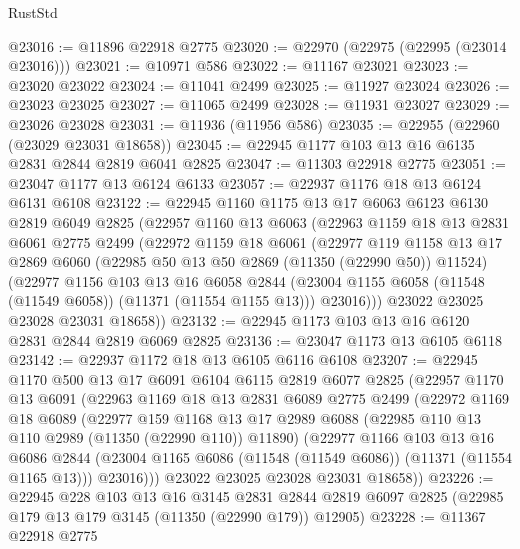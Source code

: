 \begin{lexlean}{RustStd}
\begin{coremodule}
@23016 := @11896 @22918 @2775
@23020 := @22970 (@22975 (@22995 (@23014 @23016)))
@23021 := @10971 @586
@23022 := @11167 @23021
@23023 := @23020 @23022
@23024 := @11041 @2499
@23025 := @11927 @23024
@23026 := @23023 @23025
@23027 := @11065 @2499
@23028 := @11931 @23027
@23029 := @23026 @23028
@23031 := @11936 (@11956 @586)
@23035 := @22955 (@22960 (@23029 @23031 @18658))
@23045 := @22945 @1177 @103 @13 @16 @6135 @2831 @2844 @2819 @6041 @2825
@23047 := @11303 @22918 @2775
@23051 := @23047 @1177 @13 @6124 @6133
@23057 := @22937 @1176 @18 @13 @6124 @6131 @6108
@23122 := @22945
    @1160
    @1175
    @13
    @17
    @6063
    @6123
    @6130
    @2819
    @6049
    @2825
    (@22957
      @1160
      @13
      @6063
      (@22963
        @1159
        @18
        @13
        @2831
        @6061
        @2775
        @2499
        (@22972
          @1159
          @18
          @6061
          (@22977
            @119
            @1158
            @13
            @17
            @2869
            @6060
            (@22985 @50 @13 @50 @2869 (@11350 (@22990 @50)) @11524)
            (@22977
              @1156
              @103
              @13
              @16
              @6058
              @2844
              (@23004 @1155 @6058 (@11548 (@11549 @6058)) (@11371 (@11554 @1155 @13)))
              @23016)))
        @23022
        @23025
        @23028
        @23031
        @18658))
@23132 := @22945 @1173 @103 @13 @16 @6120 @2831 @2844 @2819 @6069 @2825
@23136 := @23047 @1173 @13 @6105 @6118
@23142 := @22937 @1172 @18 @13 @6105 @6116 @6108
@23207 := @22945
    @1170
    @500
    @13
    @17
    @6091
    @6104
    @6115
    @2819
    @6077
    @2825
    (@22957
      @1170
      @13
      @6091
      (@22963
        @1169
        @18
        @13
        @2831
        @6089
        @2775
        @2499
        (@22972
          @1169
          @18
          @6089
          (@22977
            @159
            @1168
            @13
            @17
            @2989
            @6088
            (@22985 @110 @13 @110 @2989 (@11350 (@22990 @110)) @11890)
            (@22977
              @1166
              @103
              @13
              @16
              @6086
              @2844
              (@23004 @1165 @6086 (@11548 (@11549 @6086)) (@11371 (@11554 @1165 @13)))
              @23016)))
        @23022
        @23025
        @23028
        @23031
        @18658))
@23226 := @22945
    @228
    @103
    @13
    @16
    @3145
    @2831
    @2844
    @2819
    @6097
    @2825
    (@22985 @179 @13 @179 @3145 (@11350 (@22990 @179)) @12905)
@23228 := @11367 @22918 @2775

\end{coremodule}
\end{lexlean}
